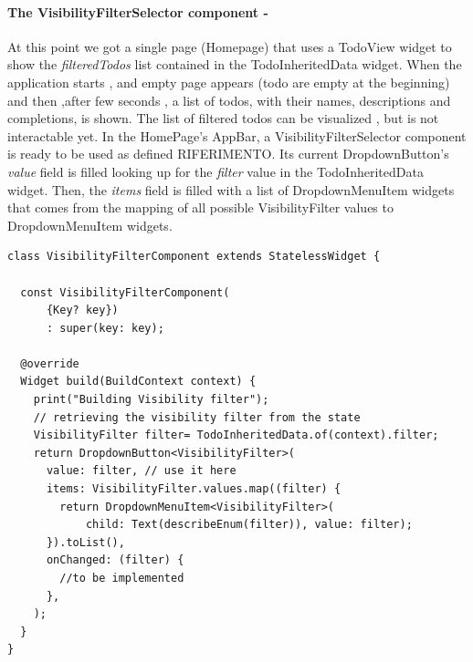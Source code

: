 \paragraph{The VisibilityFilterSelector component - }
\label{subpar:todo_app_inherited_widget_visibilityfiltercomponent_component}
At this point we got a single page (Homepage) that uses a TodoView widget to show the \textit{filteredTodos} list contained in the TodoInheritedData widget. When the application starts , and empty page appears (todo are empty at the beginning) and then ,after few seconds , a list of todos, with their names, descriptions and completions, is shown. The list of filtered todos can be visualized , but is not interactable yet. 
In the HomePage’s AppBar, a VisibilityFilterSelector component is ready to be used as defined RIFERIMENTO. Its current DropdownButton’s \textit{value} field is filled looking up for the \textit{filter} value in the TodoInheritedData widget. Then, the \textit{items} field is filled with a list of DropdownMenuItem widgets that comes from the mapping of all possible VisibilityFilter values to DropdownMenuItem widgets.
\mbox{}\\
\begin{code}

 \mbox{}

\label{code:2.22}
\begin{verbatim}
class VisibilityFilterComponent extends StatelessWidget {

  const VisibilityFilterComponent(
      {Key? key})
      : super(key: key);

  @override
  Widget build(BuildContext context) {
    print("Building Visibility filter");
    // retrieving the visibility filter from the state
    VisibilityFilter filter= TodoInheritedData.of(context).filter;
    return DropdownButton<VisibilityFilter>(
      value: filter, // use it here
      items: VisibilityFilter.values.map((filter) {
        return DropdownMenuItem<VisibilityFilter>(
            child: Text(describeEnum(filter)), value: filter);
      }).toList(),
      onChanged: (filter) {
        //to be implemented
      },
    );
  }
}
\end{verbatim}
\end{code}
\mbox{}\\
